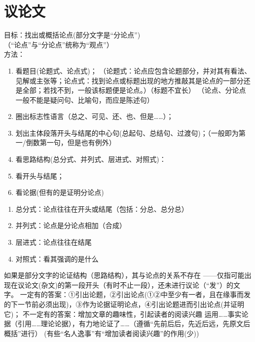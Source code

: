 \section{议论文}
  目标：找出或概括论点(部分文字是``分论点'')\\
  （``论点''与``分论点''统称为``观点''）\\
  方法：\begin{enumerate}\item 看题目(论题式、论点式)；
        （论题式：论点应包含论题部分，并对其有看法、见解或主张等；论点式：找到论点或标题出现的地方推敲其是论点的一部分还是全部；若找不到，一般该标题便是论点。）（标题不宜长）
        （论点、分论点一般不能是疑问句、比喻句，而应是陈述句）
        \item 圈出标志性语言（总之、可见、还、也、但是\ldots{}\ldots{}）；
        \item 划出主体段落开头与结尾的中心句(总起句、总结句、过渡句)；（一般即为第一/倒数第一句，但是也有例外）
        \item 看思路结构(总分式、并列式、层进式、对照式)：
        \item 看开头与结尾；
        \item 看论据(但有的是证明分论点)
\end{enumerate}
\begin{enumerate}
\item 总分式：论点往往在开头或结尾（包括：分总、总分总）
\item 并列式：论点是分论点相加（合成）
\item 层进式：论点往往在结尾
\item 对照式：看其强调的是什么
\end{enumerate}
如果是部分文字的论证结构（思路结构），其与论点的关系不存在
——仅指可能出现在议论文(杂文)的第一段开头（有时不止一段），还未进行议论（``发''）的文字。
  一定有的答案：①引出论题，②引出论点(①②中至少有一者，且在缘事而发的下一节前必须出现)，③作为论据证明论点，④引出论题进而引出论点(并证明它)；
  不一定有的答案：增加文章的趣味性，引起读者的阅读兴趣
  运用\ldots{}\ldots{}事实论据（引用\ldots{}\ldots{}理论论据），有力地论证了\ldots{}\ldots{}（遵循``先前后后，先近后远，先原文后概括''进行）
  (有些``名人逸事''有``增加读者阅读兴趣''的作用(少))

